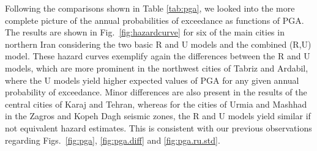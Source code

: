 
Following the comparisons shown in Table \ref{tab:pga}, we looked into the more complete picture of the annual probabilities of exceedance as functions of PGA. The results are shown in Fig.~\ref{fig:hazardcurve} for six of the main cities in northern Iran considering the two basic R and U models and the combined (R,U) model. These hazard curves exemplify again the differences between the R and U models, which are more prominent in the northwest cities of Tabriz and Ardabil, where the U models yield higher expected values of PGA for any given annual probability of exceedance. Minor differences are also present in the results of the central cities of Karaj and Tehran, whereas for the cities of Urmia and Mashhad in the Zagros and Kopeh Dagh seismic zones, the R and U models yield similar if not equivalent hazard estimates. This is consistent with our previous observations regarding Figs.~\ref{fig:pga}, \ref{fig:pga.diff} and \ref{fig:pga.ru.std}.

